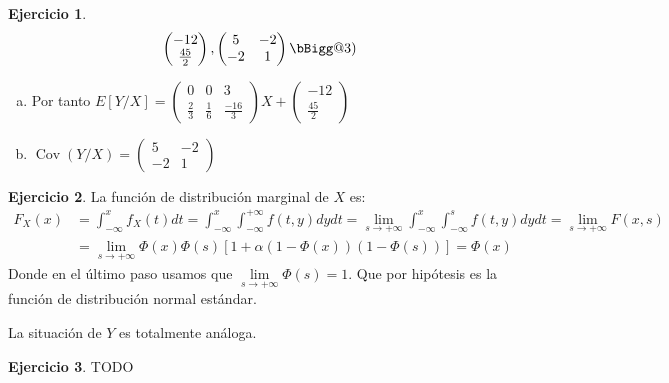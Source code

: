 \documentclass[12pt,spanish]{article}
\makeatletter
\newcommand{\vast}{\bBigg@{3}}
\theoremstyle{definition}
\newtheorem{exercise}{Ejercicio}
\makeatother
\begin{document}
\begin{exercise}
\[\begin{pmatrix}
      -12 \\ \frac{45}{2}
    \end{pmatrix},
    \begin{pmatrix}
      5 & -2 \\
      -2 & 1
    \end{pmatrix}\vast)\]
  \begin{enumerate}[a)]
  \item Por tanto $E[Y/X]=\begin{pmatrix}
      0 & 0 & 3 \\
      \frac{2}{3} & \frac{1}{6} & \frac{-16}{3}
    \end{pmatrix}X+
    \begin{pmatrix}
      -12 \\ \frac{45}{2}
    \end{pmatrix}$
  \item $\operatorname{Cov}(Y/X)=\begin{pmatrix}
      5 & -2 \\
      -2 & 1
    \end{pmatrix}$
  \end{enumerate}
\end{exercise}

\begin{exercise} %
  La función de distribución marginal de $X$ es:
  \begin{align*}
    F_X(x)&=\int_{-\infty}^xf_X(t)dt=\int_{-\infty}^x\int_{-\infty}^{+\infty}f(t,y)dydt=\lim_{s\to+\infty}\int_{-\infty}^x\int_{-\infty}^sf(t,y)dydt=\lim_{s\to+\infty}F(x,s) \\
          &=\lim_{s\to+\infty}\Phi(x)\Phi(s)[1+\alpha(1-\Phi(x))(1-\Phi(s))] = \Phi(x)
  \end{align*}
  Donde en el último paso usamos que
  $\lim\limits_{s\to+\infty}\Phi(s)=1$.
  Que por hipótesis es la función de distribución normal estándar.

  La situación de $Y$ es totalmente análoga.
\end{exercise}

\begin{exercise} %
  TODO
\end{exercise}
\end{document}
